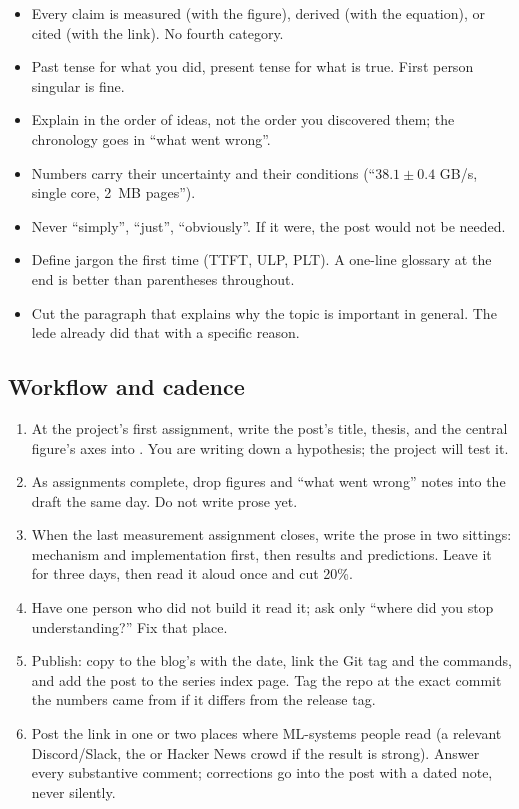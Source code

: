 \begin{itemize}
  \item Every claim is measured (with the figure), derived (with the equation), or cited (with the link). No fourth category.
  \item Past tense for what you did, present tense for what is true. First person singular is fine.
  \item Explain in the order of ideas, not the order you discovered them; the chronology goes in ``what went wrong''.
  \item Numbers carry their uncertainty and their conditions (``$38.1 \pm 0.4$ GB/s, single core, 2~MB pages'').
  \item Never ``simply'', ``just'', ``obviously''. If it were, the post would not be needed.
  \item Define jargon the first time (TTFT, ULP, PLT). A one-line glossary at the end is better than parentheses throughout.
  \item Cut the paragraph that explains why the topic is important in general. The lede already did that with a specific reason.
\end{itemize}

\subsection{Workflow and cadence}

\begin{enumerate}
  \item At the project's first assignment, write the post's title, thesis, and the central figure's axes into . You are writing down a hypothesis; the project will test it.
  \item As assignments complete, drop figures and ``what went wrong'' notes into the draft the same day. Do not write prose yet.
  \item When the last measurement assignment closes, write the prose in two sittings: mechanism and implementation first, then results and predictions. Leave it for three days, then read it aloud once and cut 20\%.
  \item Have one person who did not build it read it; ask only ``where did you stop understanding?'' Fix that place.
  \item Publish: copy to the blog's  with the date, link the Git tag and the  commands, and add the post to the series index page. Tag the repo  at the exact commit the numbers came from if it differs from the release tag.
  \item Post the link in one or two places where ML-systems people read (a relevant Discord/Slack, the  or Hacker News crowd if the result is strong). Answer every substantive comment; corrections go into the post with a dated note, never silently.
\end{enumerate}

